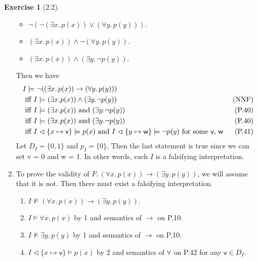 \documentclass[12pt, psamsfonts]{amsart}
\theoremstyle{definition}
\newtheorem*{exer}{Exercise}
\theoremstyle{remark}
\numberwithin{equation}{subsection}
\begin{document}
\begin{exer}[2.2]
\begin{enumerate}[label=(\alph*)]
\begin{itemize}
                \item
                    $\neg(\neg(\exists x.\, p(x)) \lor (\forall y.\, p(y)))$.
                \item
                    $(\exists x.\, p(x)) \land \neg(\forall y.\, p(y))$.
                \item
                    $(\exists x.\, p(x)) \land (\exists y.\, \neg p(y))$.
            \end{itemize}
            Then we have
            \begin{align*}
                &I \models \neg((\exists x.\, p(x)) \rightarrow (\forall y.\, p(y))) \\
                    &\text{ iff } I \models (\exists x. p(x)) \land (\exists y. \neg p(y)) & \text{(NNF)} \\
                    &\text{ iff } I \models (\exists x. p(x)) \text{ and } (\exists y. \neg p(y)) & \text{(P.40)} \\
                    &\text{ iff } I \models (\exists x. p(x)) \text{ and } (\exists y. \neg p(y)) & \text{(P.40)} \\
                    &\text{ iff } I \vartriangleleft \{ x \mapsto \textsf{v} \} \models p(x) \text{ and } I \vartriangleleft \{ y \mapsto \textsf{w} \} \models \neg p(y) \text{ for some \textsf{v}, \textsf{w} } & \text{(P.41)}
            \end{align*}
            Let $D_I = \{ 0, 1 \}$ and $p_I = \{ 0 \}$.
            Then the last statement is true since we can set \textsf{v} = 0 and \textsf{w} = 1.
            In other words, such $I$ is a falsifying interpretation.
        \item %
            To prove the validity of $F: (\forall x.\, p(x)) \rightarrow (\exists y.\, p(y))$, we will assume that it is not.
            Then there must exist a falsifying interpretation.
            \begin{enumerate}[label=\arabic*.]
               \item %
                   $I \not\models (\forall x.\, p(x)) \rightarrow (\exists y.\, p(y))$.
               \item %
                   $I \models \forall x.\, p(x)$ by 1 and semantics of $\rightarrow$ on P.10.
               \item %
                   $I \not\models \exists y.\, p(y)$ by 1 and semantics of $\rightarrow$ on P.10.
               \item %
                   $I \vartriangleleft \{ x \mapsto \textsf{v} \} \models p(x)$ by 2 and semantics of $\forall$ on P.42 for any $\textsf{v} \in D_I$.

\end{enumerate}
\end{enumerate}
\end{exer}
\end{document}
